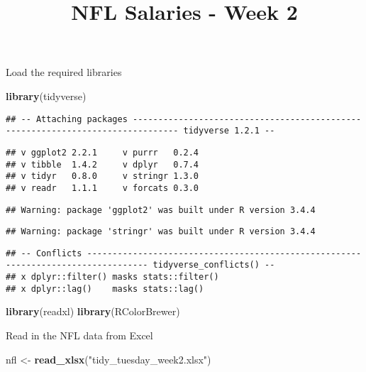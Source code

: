 \documentclass[]{article}
\title{NFL Salaries - Week 2}
\author{}
\date{}
\newenvironment{Shaded}{\begin{snugshade}}{\end{snugshade}}
\newcommand{\KeywordTok}[1]{\textcolor[rgb]{0.13,0.29,0.53}{\textbf{#1}}}
\newcommand{\StringTok}[1]{\textcolor[rgb]{0.31,0.60,0.02}{#1}}
\newcommand{\NormalTok}[1]{#1}
\begin{document}
\maketitle

Load the required libraries

\begin{Shaded}
\begin{Highlighting}[]
\KeywordTok{library}\NormalTok{(tidyverse)}
\end{Highlighting}
\end{Shaded}

\begin{verbatim}
## -- Attaching packages ------------------------------------------------------------------------------- tidyverse 1.2.1 --
\end{verbatim}

\begin{verbatim}
## v ggplot2 2.2.1     v purrr   0.2.4
## v tibble  1.4.2     v dplyr   0.7.4
## v tidyr   0.8.0     v stringr 1.3.0
## v readr   1.1.1     v forcats 0.3.0
\end{verbatim}

\begin{verbatim}
## Warning: package 'ggplot2' was built under R version 3.4.4
\end{verbatim}

\begin{verbatim}
## Warning: package 'stringr' was built under R version 3.4.4
\end{verbatim}

\begin{verbatim}
## -- Conflicts ---------------------------------------------------------------------------------- tidyverse_conflicts() --
## x dplyr::filter() masks stats::filter()
## x dplyr::lag()    masks stats::lag()
\end{verbatim}

\begin{Shaded}
\begin{Highlighting}[]
\KeywordTok{library}\NormalTok{(readxl)}
\KeywordTok{library}\NormalTok{(RColorBrewer)}
\end{Highlighting}
\end{Shaded}

Read in the NFL data from Excel

\begin{Shaded}
\begin{Highlighting}[]
\NormalTok{nfl <-}\StringTok{ }\KeywordTok{read_xlsx}\NormalTok{(}\StringTok{"tidy_tuesday_week2.xlsx"}\NormalTok{)}
\end{Highlighting}
\end{Shaded}
\end{document}

